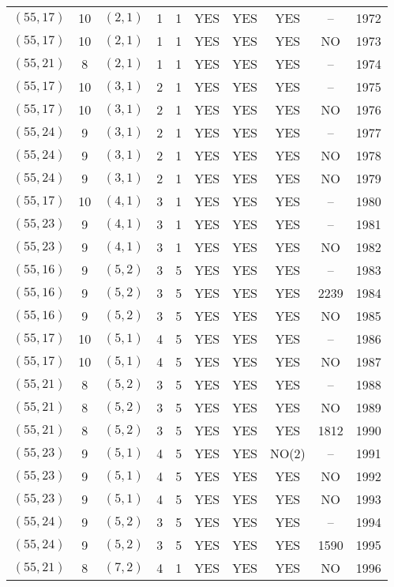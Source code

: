 \begin{longtable}{|c|c|c|c|c|c|c|c|c|c|}
$(55, 17)$ & 10 & $(2, 1)$ & 1 & 1 & YES & YES & YES & -- & 1972\\
$(55, 17)$ & 10 & $(2, 1)$ & 1 & 1 & YES & YES & YES & NO & 1973\\
$(55, 21)$ & 8 & $(2, 1)$ & 1 & 1 & YES & YES & YES & -- & 1974\\
$(55, 17)$ & 10 & $(3, 1)$ & 2 & 1 & YES & YES & YES & -- & 1975\\
$(55, 17)$ & 10 & $(3, 1)$ & 2 & 1 & YES & YES & YES & NO & 1976\\
$(55, 24)$ & 9 & $(3, 1)$ & 2 & 1 & YES & YES & YES & -- & 1977\\
$(55, 24)$ & 9 & $(3, 1)$ & 2 & 1 & YES & YES & YES & NO & 1978\\
$(55, 24)$ & 9 & $(3, 1)$ & 2 & 1 & YES & YES & YES & NO & 1979\\
$(55, 17)$ & 10 & $(4, 1)$ & 3 & 1 & YES & YES & YES & -- & 1980\\
$(55, 23)$ & 9 & $(4, 1)$ & 3 & 1 & YES & YES & YES & -- & 1981\\
$(55, 23)$ & 9 & $(4, 1)$ & 3 & 1 & YES & YES & YES & NO & 1982\\
$(55, 16)$ & 9 & $(5, 2)$ & 3 & 5 & YES & YES & YES & -- & 1983\\
$(55, 16)$ & 9 & $(5, 2)$ & 3 & 5 & YES & YES & YES & 2239 & 1984\\
$(55, 16)$ & 9 & $(5, 2)$ & 3 & 5 & YES & YES & YES & NO & 1985\\
$(55, 17)$ & 10 & $(5, 1)$ & 4 & 5 & YES & YES & YES & -- & 1986\\
$(55, 17)$ & 10 & $(5, 1)$ & 4 & 5 & YES & YES & YES & NO & 1987\\
$(55, 21)$ & 8 & $(5, 2)$ & 3 & 5 & YES & YES & YES & -- & 1988\\
$(55, 21)$ & 8 & $(5, 2)$ & 3 & 5 & YES & YES & YES & NO & 1989\\
$(55, 21)$ & 8 & $(5, 2)$ & 3 & 5 & YES & YES & YES & 1812 & 1990\\
$(55, 23)$ & 9 & $(5, 1)$ & 4 & 5 & YES & YES & NO(2) & -- & 1991\\
$(55, 23)$ & 9 & $(5, 1)$ & 4 & 5 & YES & YES & YES & NO & 1992\\
$(55, 23)$ & 9 & $(5, 1)$ & 4 & 5 & YES & YES & YES & NO & 1993\\
$(55, 24)$ & 9 & $(5, 2)$ & 3 & 5 & YES & YES & YES & -- & 1994\\
$(55, 24)$ & 9 & $(5, 2)$ & 3 & 5 & YES & YES & YES & 1590 & 1995\\
$(55, 21)$ & 8 & $(7, 2)$ & 4 & 1 & YES & YES & YES & NO & 1996\\

\end{longtable}
